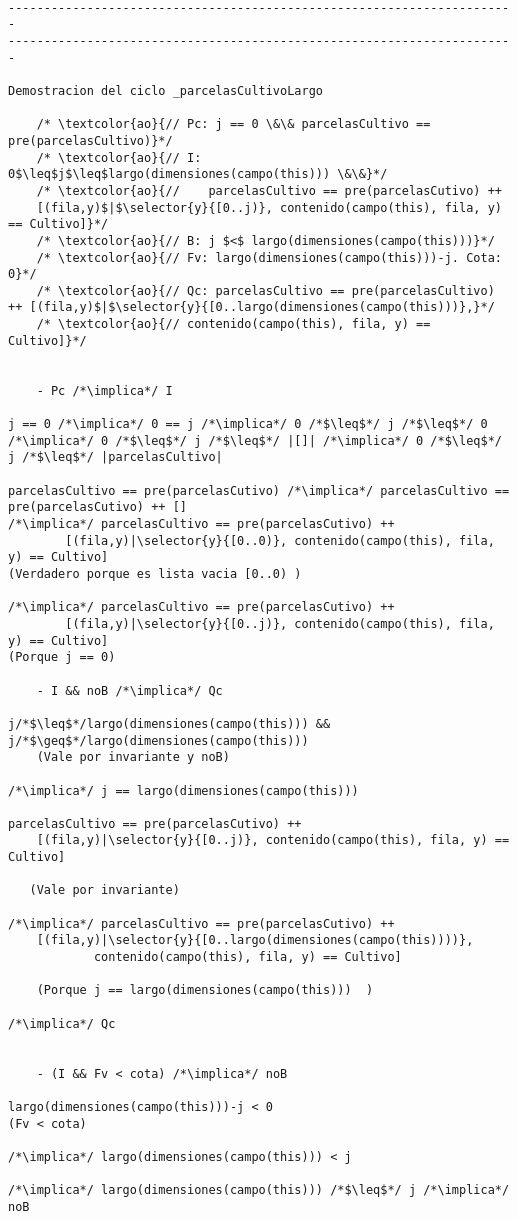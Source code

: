 \begin{lstlisting}
	
-----------------------------------------------------------------------
-----------------------------------------------------------------------

Demostracion del ciclo _parcelasCultivoLargo

    /* \textcolor{ao}{// Pc: j == 0 \&\& parcelasCultivo == pre(parcelasCultivo)}*/      
    /* \textcolor{ao}{// I: 0$\leq$j$\leq$largo(dimensiones(campo(this))) \&\&}*/        
    /* \textcolor{ao}{//    parcelasCultivo == pre(parcelasCutivo) ++ 
    [(fila,y)$|$\selector{y}{[0..j)}, contenido(campo(this), fila, y) == Cultivo]}*/ 
    /* \textcolor{ao}{// B: j $<$ largo(dimensiones(campo(this)))}*/
	/* \textcolor{ao}{// Fv: largo(dimensiones(campo(this)))-j. Cota: 0}*/     
    /* \textcolor{ao}{// Qc: parcelasCultivo == pre(parcelasCultivo) ++ [(fila,y)$|$\selector{y}{[0..largo(dimensiones(campo(this)))},}*/
    /* \textcolor{ao}{// contenido(campo(this), fila, y) == Cultivo]}*/      


    - Pc /*\implica*/ I
   
j == 0 /*\implica*/ 0 == j /*\implica*/ 0 /*$\leq$*/ j /*$\leq$*/ 0
/*\implica*/ 0 /*$\leq$*/ j /*$\leq$*/ |[]| /*\implica*/ 0 /*$\leq$*/ j /*$\leq$*/ |parcelasCultivo|

parcelasCultivo == pre(parcelasCutivo) /*\implica*/ parcelasCultivo == pre(parcelasCutivo) ++ []
/*\implica*/ parcelasCultivo == pre(parcelasCutivo) ++ 
		[(fila,y)|\selector{y}{[0..0)}, contenido(campo(this), fila, y) == Cultivo]
(Verdadero porque es lista vacia [0..0) )

/*\implica*/ parcelasCultivo == pre(parcelasCutivo) ++ 
		[(fila,y)|\selector{y}{[0..j)}, contenido(campo(this), fila, y) == Cultivo]    
(Porque j == 0)

    - I && noB /*\implica*/ Qc

j/*$\leq$*/largo(dimensiones(campo(this))) && j/*$\geq$*/largo(dimensiones(campo(this)))
	(Vale por invariante y noB)

/*\implica*/ j == largo(dimensiones(campo(this)))

parcelasCultivo == pre(parcelasCutivo) ++ 
    [(fila,y)|\selector{y}{[0..j)}, contenido(campo(this), fila, y) == Cultivo]
  
   (Vale por invariante)

/*\implica*/ parcelasCultivo == pre(parcelasCutivo) ++ 
    [(fila,y)|\selector{y}{[0..largo(dimensiones(campo(this))))}, 
    		contenido(campo(this), fila, y) == Cultivo]

	(Porque j == largo(dimensiones(campo(this)))  )

/*\implica*/ Qc

	
    - (I && Fv < cota) /*\implica*/ noB
    
largo(dimensiones(campo(this)))-j < 0
(Fv < cota)

/*\implica*/ largo(dimensiones(campo(this))) < j

/*\implica*/ largo(dimensiones(campo(this))) /*$\leq$*/ j /*\implica*/ noB

\end{lstlisting}


